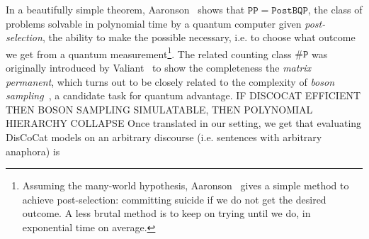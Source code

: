 In a beautifully simple theorem, Aaronson~\cite{Aaronson05} shows that $\mathtt{PP} = \mathtt{PostBQP}$, the class of problems solvable in polynomial time by a quantum computer given \emph{post-selection}, the ability to make the possible necessary, i.e. to choose what outcome we get from a quantum measurement\footnote
{Assuming the many-world hypothesis, Aaronson~\cite{Aaronson05} gives a simple method to achieve post-selection: committing suicide if we do not get the desired outcome.
A less brutal method is to keep on trying until we do, in exponential time on average.}.
The related counting class $\mathtt{\#P}$ was originally introduced by Valiant~\cite{Valiant79} to show the completeness the \emph{matrix permanent}, which turns out to be closely related to the complexity of \emph{boson sampling}~\cite{AaronsonArkhipov11}, a candidate task for quantum advantage.
IF DISCOCAT EFFICIENT THEN BOSON SAMPLING SIMULATABLE, THEN POLYNOMIAL HIERARCHY COLLAPSE
Once translated in our setting, we get that evaluating DisCoCat models on an arbitrary discourse (i.e. sentences with arbitrary anaphora) is
